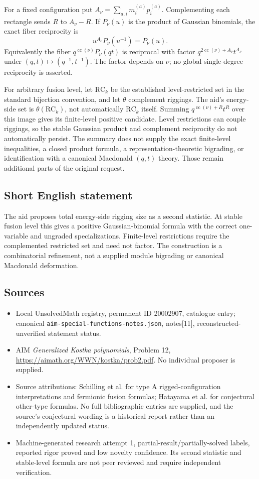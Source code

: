\documentclass[11pt]{article}
\begin{document}
For a fixed configuration put \(A_\nu=\sum_{a,i}m_i^{(a)}p_i^{(a)}\). Complementing each rectangle sends \(R\) to \(A_\nu-R\). If \(P_\nu(u)\) is the product of Gaussian binomials, the exact fiber reciprocity is
\[
 u^{A_\nu}P_\nu(u^{-1})=P_\nu(u).
\]
Equivalently the fiber \(q^{\operatorname{cc}(\nu)}P_\nu(qt)\) is reciprocal with factor \(q^{2\operatorname{cc}(\nu)+A_\nu}t^{A_\nu}\) under \((q,t)\mapsto(q^{-1},t^{-1})\). The factor depends on \(\nu\); no global single-degree reciprocity is asserted.

For arbitrary fusion level, let \(\mathrm{RC}_k\) be the established level-restricted set in the standard bijection convention, and let \(\theta\) complement riggings. The aid's energy-side set is \(\theta(\mathrm{RC}_k)\), not automatically \(\mathrm{RC}_k\) itself. Summing \(q^{\operatorname{cc}(\nu)+R}t^R\) over this image gives its finite-level positive candidate. Level restrictions can couple riggings, so the stable Gaussian product and complement reciprocity do not automatically persist. The summary does not supply the exact finite-level inequalities, a closed product formula, a representation-theoretic bigrading, or identification with a canonical Macdonald \((q,t)\) theory. Those remain additional parts of the original request.
\subsection{Short English statement}
The aid proposes total energy-side rigging size as a second statistic. At stable fusion level this gives a positive Gaussian-binomial formula with the correct one-variable and ungraded specializations. Finite-level restrictions require the complemented restricted set and need not factor. The construction is a combinatorial refinement, not a supplied module bigrading or canonical Macdonald deformation.
\subsection{Sources}
\begin{itemize}
\item Local UnsolvedMath registry, permanent ID 20002907, catalogue entry; canonical \texttt{aim-special-functions-notes.json}, notes[11], reconstructed-unverified statement status.
\item AIM \emph{Generalized Kostka polynomials}, Problem 12, \url{https://aimath.org/WWN/kostka/prob2.pdf}. No individual proposer is supplied.
\item Source attributions: Schilling et al. for type A rigged-configuration interpretations and fermionic fusion formulas; Hatayama et al. for conjectural other-type formulas. No full bibliographic entries are supplied, and the source's conjectural wording is a historical report rather than an independently updated status.
\item Machine-generated research attempt 1, partial-result/partially-solved labels, reported rigor proved and low novelty confidence. Its second statistic and stable-level formula are not peer reviewed and require independent verification.
\end{itemize}
\end{document}
